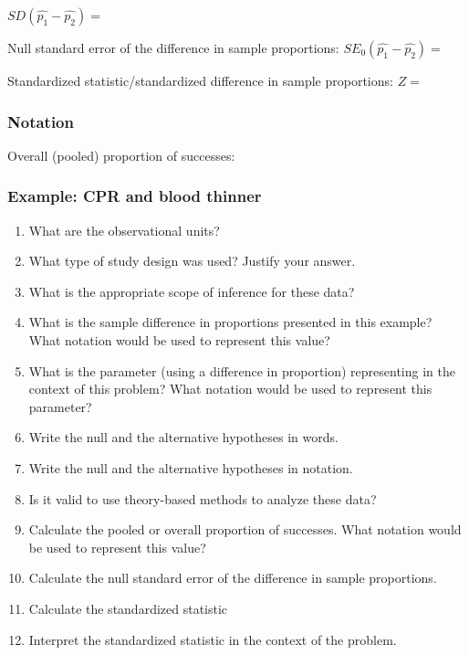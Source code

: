 \documentclass[
]{report}
\newcommand{\rgs}{\vspace{12pt}} %
\begin{document}
\(SD(\hat{p_1} - \hat{p_2})=\)
\rgs

Null standard error of the difference in sample proportions:
\(SE_0(\hat{p_1} - \hat{p_2})=\)
\rgs

Standardized statistic/standardized difference in sample proportions:
\(Z=\)
\rgs

\hypertarget{notation-1}{%
\subsubsection*{Notation}\label{notation-1}}

Overall (pooled) proportion of successes:
\rgs

\hypertarget{example-cpr-and-blood-thinner-2}{%
\subsubsection*{Example: CPR and blood thinner}\label{example-cpr-and-blood-thinner-2}}

\begin{enumerate}
\def\labelenumi{\arabic{enumi}.}
\item
  What are the observational units?
  \rgs
\item
  What type of study design was used? Justify your answer.
  \rgs
\item
  What is the appropriate scope of inference for these data?
  \rgs
\item
  What is the sample difference in proportions presented in this example? What notation would be used to represent this value?
  \rgs
\item
  What is the parameter (using a difference in proportion) representing in the context of this problem? What notation would be used to represent this parameter?
  \rgs
\item
  Write the null and the alternative hypotheses in words.
  \rgs
  \rgs
\item
  Write the null and the alternative hypotheses in notation.
  \rgs
\item
  Is it valid to use theory-based methods to analyze these data?
  \rgs
  \rgs
\item
  Calculate the pooled or overall proportion of successes. What notation would be used to represent this value?
  \rgs
  \rgs
\item
  Calculate the null standard error of the difference in sample proportions.
  \rgs
  \rgs
\item
  Calculate the standardized statistic
  \rgs
  \rgs
\item
  Interpret the standardized statistic in the context of the problem.
  \rgs
  \rgs
\end{enumerate}
\end{document}
